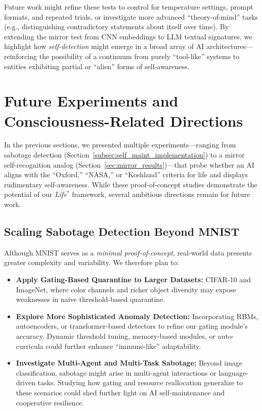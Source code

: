 \documentclass[12pt]{article}
\begin{document}
Future work might refine these tests to control for temperature settings, 
prompt formats, and repeated trials, or investigate more advanced “theory-of-mind” 
tasks (e.g., distinguishing contradictory statements about itself over time). 
By extending the mirror test from CNN embeddings to LLM textual signatures, 
we highlight how \emph{self-detection} might emerge in a broad array of AI 
architectures—reinforcing the possibility of a continuum from purely “tool-like” 
systems to entities exhibiting partial or “alien” forms of self-awareness.




\section{Future Experiments and Consciousness-Related Directions}
\label{sec:future_experiments}

In the previous sections, we presented multiple experiments—ranging from sabotage
detection (Section~\ref{subsec:self_maint_implementation}) to a mirror
self-recognition analog (Section~\ref{sec:mirror_results})—that probe whether an AI
aligns with the ``Oxford,'' ``NASA,'' or ``Koshland'' criteria for life and displays
rudimentary self-awareness. While these proof-of-concept studies demonstrate the
potential of our \emph{Life\(^*\)} framework, several ambitious directions remain
for future work.

\subsection{Scaling Sabotage Detection Beyond MNIST}

Although MNIST serves as a \emph{minimal proof-of-concept}, real-world data
presents greater complexity and variability. We therefore plan to:
\begin{itemize}
    \item \textbf{Apply Gating-Based Quarantine to Larger Datasets:} CIFAR-10 and
          ImageNet, where color channels and richer object diversity may expose
          weaknesses in naive threshold-based quarantine.
    \item \textbf{Explore More Sophisticated Anomaly Detection:} Incorporating RBMs,
          autoencoders, or transformer-based detectors to refine our gating module’s
          accuracy. Dynamic threshold tuning, memory-based modules, or auto-curricula
          could further enhance “immune-like” adaptability.
    \item \textbf{Investigate Multi-Agent and Multi-Task Sabotage:} Beyond image
          classification, sabotage might arise in multi-agent interactions or
          language-driven tasks. Studying how gating and resource reallocation
          generalize to these scenarios could shed further light on AI self-maintenance
          and cooperative resilience.
\end{itemize}
\end{document}

